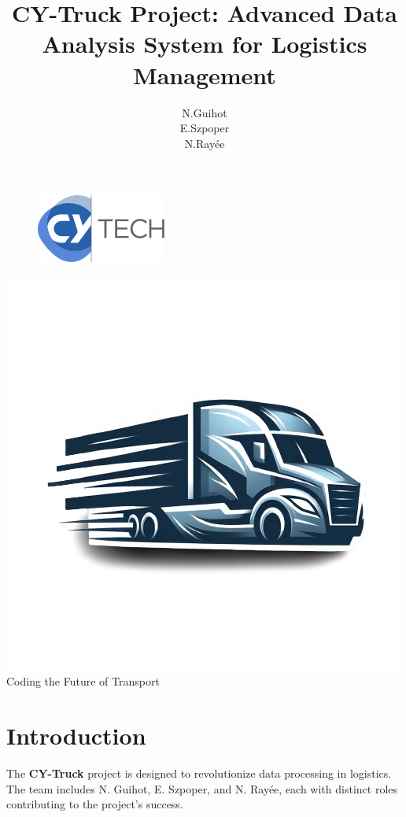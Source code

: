 \documentclass[11pt]{article}
\title{\textbf{CY-Truck Project: Advanced Data Analysis System for Logistics Management}}
\author{N.Guihot \\ E.Szpoper \\ N.Rayée }
\date{}
\begin{document}
\maketitle

\begin{figure}
    \centering
    \includegraphics[scale=0.5]{cyl.png}
\end{figure}


\tableofcontents
\newpage
\begin{center}
    \includegraphics[scale=0.2]{logo.png} \\
    Coding the Future of Transport
\end{center}


\section{Introduction}
The \textbf{\color{blue}CY-Truck}  project is designed to revolutionize data processing in logistics. The team includes N. Guihot, E. Szpoper, and N. Rayée, each with distinct roles contributing to the project's success.
\end{document}
